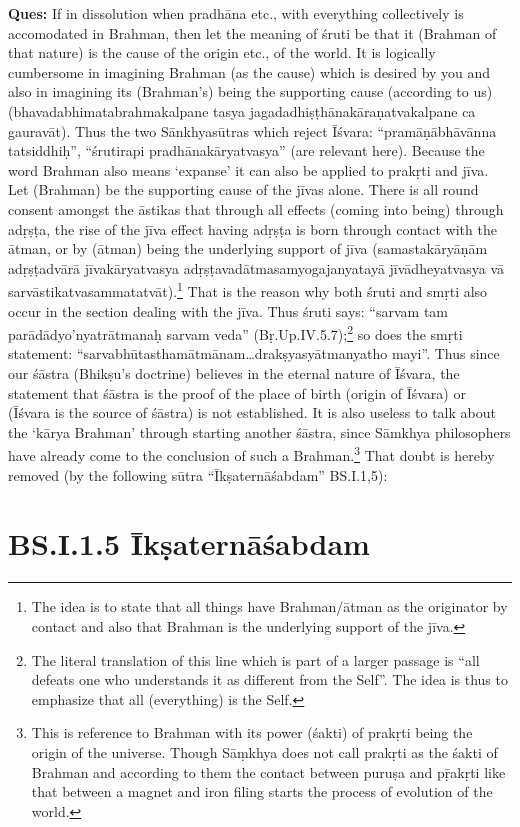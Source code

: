 \textbf{Ques:} If in dissolution when pradhāna etc., with everything collectively is accomodated in Brahman, then let the meaning of śruti be that it (Brahman of that nature) is the cause of the origin etc., of the world. It is logically cumbersome in imagining Brahman (as the cause) which is desired by you and also in imagining its (Brahman’s) being the supporting cause (according to us) (bhavadabhimatabrahmakalpane tasya jagadadhiṣṭhānakāraṇatvakalpane ca gauravāt). Thus the two Sānkhyasūtras which reject Īśvara: “pramāṇābhāvānna tatsiddhiḥ”, “śrutirapi pradhānakāryatvasya” (are relevant here). Because the word Brahman also means ‘expanse’ it can also be applied to prakṛti and jīva. Let (Brahman) be the supporting cause of the jīvas alone. There is all round consent amongst the āstikas that through all effects (coming into being) through adṛṣṭa, the rise of the jīva effect  having adṛṣṭa is born through contact with the ātman,  or by (ātman) being the underlying support of jīva  (samastakāryāṇām adṛṣṭadvārā jīvakāryatvasya adṛṣṭavadātmasamyogajanyatayā jīvādheyatvasya vā sarvāstikatvasammatatvāt).\footnote{The idea is to state that all things have Brahman/ātman as the originator by contact and also that Brahman is the underlying support of the jīva.} That is the reason why both śruti and smṛti also occur in the section dealing with the jīva. Thus śruti says: “sarvam tam parādādyo’nyatrātmanaḥ sarvam veda” (Bṛ.Up.IV.5.7);\footnote{The literal translation of this line which is part of a larger passage is “all defeats one who understands it as different from the Self”. The idea is thus to emphasize that all (everything) is the Self.} so does the smṛti statement: “sarvabhūtasthamātmānam…drakṣyasyātmanyatho mayi”. Thus since our śāstra (Bhikṣu’s doctrine) believes in the eternal nature of Īśvara, the statement that śāstra is the proof of the place of birth (origin of Īśvara) or (Īśvara is the source of śāstra) is not established. It is also useless to talk about the ‘kārya Brahman’ through starting another śāstra, since Sāmkhya philosophers have already come to the conclusion of such a Brahman.\footnote{This is reference to Brahman with its power (śakti) of prakṛti being the origin of the universe. Though Sāṃkhya does not call prakṛti as the śakti of Brahman and according to them the contact between puruṣa and pṝakṛti like that between a magnet and iron filing starts the process of evolution of the world.} That doubt is hereby removed (by the following sūtra “Īkṣaternāśabdam” BS.I.1,5):

\section*{BS.I.1.5 Īkṣaternāśabdam}

